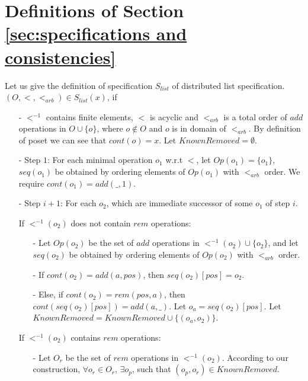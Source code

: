 \forget
{

\section{Definitions of Section \ref{sec:specifications and consistencies}}
\label{sec:appendix definitions of section specifications and consistencies}

Let us give the definition of specification $S_{\mathit{list}}$ of distributed list specification. $(O,<,<_{\mathit{arb}}) \in S_{\mathit{list}}(x)$, if

\begin{itemize}
\setlength{\itemsep}{0.5pt}
\item[-] $<^{-1}$ contains finite elements, $<$ is acyclic and $<_{\mathit{arb}}$ is a total order of $add$ operations in $O \cup \{ o \}$, where $o \notin O$ and $o$ is in domain of $<_{\mathit{arb}}$. By definition of poset we can see that $cont(o)=x$. Let $KnownRemoved=\emptyset$.

\item[-] Step $1$: For each minimal operation $o_1$ w.r.t $<$, let $Op(o_1)=\{ o_1 \}$, $seq(o_1)$ be obtained by ordering elements of $Op(o_1)$ with $<_{\mathit{arb}}$ order. We require $cont(o_1)=add(\_,1)$.

\item[-] Step $i+1$: For each $o_2$, which are immediate successor of some $o_1$ of step $i$.

    If $<^{-1}(o_2)$ does not contain $rem$ operations:

    \begin{itemize}
    \setlength{\itemsep}{0.5pt}
    \item[-] Let $Op(o_2)$ be the set of $add$ operations in $<^{-1}(o_2) \cup \{ o_2 \}$, and let $seq(o_2)$ be obtained by ordering elements of $Op(o_2)$ with $<_{\mathit{arb}}$ order.

    \item[-] If $cont(o_2) = add(a,pos)$, then $seq(o_2)[pos] = o_2$.

    \item[-] Else, if $cont(o_2) = rem(pos,a)$, then $cont(seq(o_2)[pos])=add(a,\_)$. Let $o_a=seq(o_2)[pos]$. Let $KnownRemoved = KnownRemoved \cup \{ (o_a,o_2) \}$.
    \end{itemize}

    If $<^{-1}(o_2)$ contains $rem$ operations:

    \begin{itemize}
    \setlength{\itemsep}{0.5pt}
    \item[-] Let $O_r$ be the set of $rem$ operations in $<^{-1}(o_2)$. According to our construction, $\forall o_r \in O_r$, $\exists o_p$, such that $(o_p,o_r) \in KnownRemoved$.


\end{itemize}
\end{itemize}}
